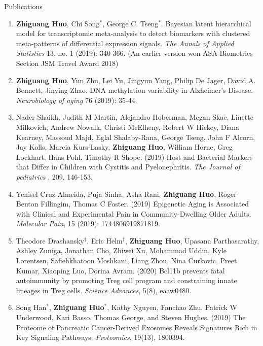 \documentclass{resume} %
\begin{document}
\begin{rSection}{Publications}
\begin{enumerate}[noitemsep,topsep=0pt,resume]
\item 
{\bf Zhiguang Huo}, Chi Song$^*$, George C. Tseng$^*$. 
Bayesian latent hierarchical model for transcriptomic meta-analysis to detect biomarkers with clustered meta-patterns of differential expression signals. \emph{The Annals of Applied Statistics} 13, no. 1 (2019): 340-366. (An earlier version won ASA Biometrics Section JSM Travel Award 2018)


\item 
{\bf Zhiguang Huo}, Yun Zhu, Lei Yu, Jingyun Yang, Philip De Jager, David A. Bennett, Jinying Zhao.
 DNA methylation variability in Alzheimer's Disease. \emph{Neurobiology of aging} 76 (2019): 35-44.


\item  
Nader Shaikh, Judith M Martin, Alejandro Hoberman, Megan Skae, Linette Milkovich, Andrew Nowalk, Christi McElheny, Robert W Hickey, Diana Kearney, Massoud Majd, Eglal Shalaby-Rana, George Tseng, John F Alcorn, Jay Kolls, Marcia Kurs-Lasky, {\bf Zhiguang Huo}, William Horne, Greg Lockhart, Hans Pohl, Timothy R Shope. 
(2019)
Host and Bacterial Markers that Differ in Children with Cystitis and Pyelonephritis. \emph{The Journal of pediatrics} , 209, 146-153.

\item Yenisel Cruz-Almeida, Puja Sinha, Asha Rani, {\bf Zhiguang Huo}, Roger Benton Fillingim, Thomas C Foster. (2019)
Epigenetic Aging is Associated with Clinical and Experimental Pain in Community-Dwelling Older Adults.
\emph{Molecular Pain}, 15 (2019): 1744806919871819.

\item 
Theodore Drashansky$^\dagger$, Eric  Helm$^\dagger$, {\bf Zhiguang Huo}, Upasana Parthasarathy,  Ashley Zuniga, Jonathan Cho, Zhiwei Xu,  Mohammad Uddin,  Kyle Lorentsen, Safiehkhatoon Moshkani, Liang Zhou, Nina Curkovic, Preet Kumar,  Xiaoping Luo, Dorina Avram. (2020)
Bcl11b prevents fatal autoimmunity by promoting Treg cell program and constraining innate lineages in Treg cells. 
\emph{Science Advances}, 5(8), eaaw0480.


\item Song Han$^*$, {\bf Zhiguang Huo}$^*$,  Kathy Nguyen,  Fanchao Zhu, Patrick W Underwood, Kari Basso, Thomas George, and Steven Hughes. (2019)
The Proteome of Pancreatic Cancer-Derived Exosomes Reveals Signatures Rich in Key Signaling Pathways. \emph{Proteomics}, 19(13), 1800394.


\end{enumerate}


\end{rSection}
\end{document}
